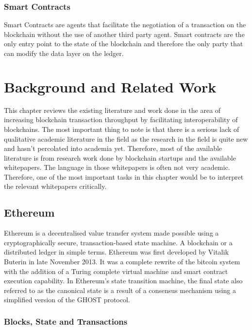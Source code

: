 \documentclass[a4paper,twoside,phd]{BYUPhys}
\begin{document}
\subsection{Smart Contracts}
Smart Contracts are agents that facilitate the negotiation of a transaction on the blockchain without the use of another third party agent. Smart contracts are the only entry point to the state of the blockchain and therefore the only party that can modify the data layer on the ledger.

\chapter{Background and Related Work}
This chapter reviews the existing literature and work done in the area of increasing blockchain transaction throughput by facilitating interoperability of blockchains. The most important thing to note is that there is a serious lack of qualitative academic literature in the field as the research in the field is quite new and hasn't percolated into academia yet. Therefore, most of the available literature is from research work done by blockchain startups and the available whitepapers. The language in those whitepapers is often not very academic. Therefore, one of the most important tasks in this chapter would be to interpret the relevant whitepapers critically.
\section{Ethereum}
Ethereum is a decentralised value transfer system made possible using a cryptographically secure, transaction-based state machine. A blockchain or a distributed ledger in simple terms. Ethereum was first developed by Vitalik Buterin in late November 2013. It was a complete rewrite of the bitcoin system with the addition of a Turing complete virtual machine and smart contract execution capability. In Ethereum's state transition machine, the final state also referred to as the canonical state is a result of a consensus mechanism using a simplified version of the GHOST protocol.

\subsection{Blocks, State and Transactions}
\end{document}
